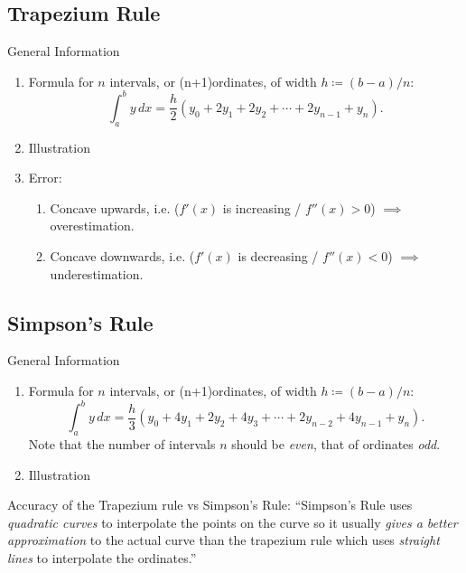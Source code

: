 \documentclass[oneside]{book}
\begin{document}
\subsection{Trapezium Rule}
\begin{stbox}{General Information}
    \begin{enumerate}
      \item Formula for \(n\) intervals, or (n+1)ordinates, of width \(h\coloneq (b-a)/n\): 
      \[\int_{a}^{b}y\,dx=\frac{h}{2}(y_0+2y_1+2y_2+\cdots+2y_{n-1}+y_n).\]
      \item Illustration
      \begin{center}
        
      \end{center}
    \item Error: 
    \begin{enumerate}
      \item Concave upwards, i.e. (\(f'(x)\) is increasing / \(f''(x)>0\)) \(\implies\) overestimation.
      \item Concave downwards, i.e. (\(f'(x)\) is decreasing / \(f''(x)<0\)) \(\implies\) underestimation.
    \end{enumerate}
    \end{enumerate}
    \end{stbox}
    \newpage
    \subsection{Simpson's Rule}
    \begin{stbox}{General Information}
      \begin{enumerate}
        \item Formula for \(n\) intervals, or (n+1)ordinates, of width \(h\coloneq (b-a)/n\):
        \[\int_{a}^{b}y\,dx=\frac{h}{3}(y_0+4y_1+2y_2+4y_3+\cdots+2y_{n-2}+4y_{n-1}+y_n).\]
        Note that the number of intervals \(n\) should be \emph{even}, that of ordinates \emph{odd}.
        \item Illustration
        \begin{center}
          
        \end{center}
      \end{enumerate}
    \end{stbox}
      \begin{note}
        Accuracy of the Trapezium rule vs Simpson's Rule:
        ``Simpson's Rule uses \emph{quadratic curves} to interpolate the points on the curve so it usually \emph{gives a better approximation} to the actual curve than the trapezium rule which uses \emph{straight lines} to interpolate the ordinates.''
      \end{note}
\end{document}
